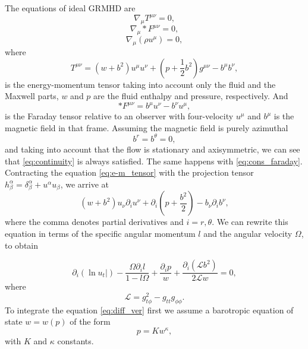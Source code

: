 \documentclass{aa}
\begin{document}
The equations of ideal GRMHD are
\begin{equation}\label{eq:e-m_cons}
\nabla_{\mu} T^{\mu\nu} = 0,
\end{equation}
\begin{equation}\label{eq:cons_faraday}
\nabla_{\mu} \ast F^{\mu\nu} = 0,
\end{equation}
\begin{equation}\label{eq:continuity}
\nabla_{\mu} (\rho u^{\mu}) = 0,
\end{equation}
where
\begin{equation}\label{eq:e-m_tensor}
T^{\mu\nu} = (w + b^2)u^{\mu}u^{\nu} + \left(p + \frac{1}{2}b^2\right)g^{\mu\nu} - b^{\mu}b^{\nu},
\end{equation}
is the energy-momentum tensor taking into account only the fluid and the Maxwell parts, $w$ and $p$ are the fluid enthalpy and pressure, respectively. And
\begin{equation}
\ast F^{\mu\nu} = b^{\mu}u^{\nu} - b^{\nu}u^{\mu},
\end{equation}
is the Faraday tensor relative to an observer with four-velocity $u^{\mu}$ and $b^{\mu}$ is the magnetic field in that frame.
Assuming the magnetic field is purely azimuthal
\begin{equation}
b^r = b^{\theta} = 0,
\end{equation}
and taking into account that the flow is stationary and axisymmetric, we can see that \eqref{eq:continuity} is always satisfied. The same happens with \eqref{eq:cons_faraday}. Contracting the equation \eqref{eq:e-m_tensor} with the projection tensor $h^{\alpha}_{\beta} = \delta^{\alpha}_{\beta} + u^{\alpha}u_{\beta}$, we arrive at
\begin{equation}
(w + b^2)u_{\nu}\partial_i u^{\nu} + \partial_i\left(p + \frac{b^2}{2}\right) - b_{\nu}\partial_i b^{\nu},
\end{equation}
where the comma denotes partial derivatives and $i = r, \theta$. We can rewrite this equation in terms of the specific angular momentum $l$ and the angular velocity $\Omega$, to obtain

\begin{equation}\label{eq:diff_ver}
\partial_i(\ln u_t|) - \frac{\Omega \partial_i l}{1-l\Omega} + \frac{\partial_i p}{w} + \frac{\partial_i(\mathcal{L}b^2)}{2\mathcal{L}w} = 0,
\end{equation}
where 
\begin{equation}
\mathcal{L} = g_{t\phi}^2 - g_{tt}g_{\phi\phi}.
\end{equation}
To integrate the equation \eqref{eq:diff_ver} first we assume a barotropic equation of state $w = w(p)$ of the form
\begin{equation}\label{eq:eos_fluid}
p = K w^{\kappa},
\end{equation}
with $K$ and $\kappa$ constants.
\end{document}
